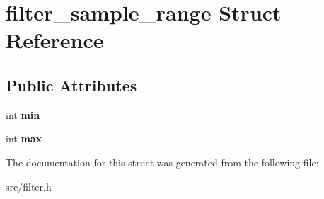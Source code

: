 \hypertarget{structfilter__sample__range}{}\section{filter\+\_\+sample\+\_\+range Struct Reference}
\label{structfilter__sample__range}
\subsection*{Public Attributes}
\begin{DoxyCompactItemize}
\item 
\hypertarget{structfilter__sample__range_a304ee67b1a15b4a0f36ca190a56a38c7}{}int {\bfseries min}\label{structfilter__sample__range_a304ee67b1a15b4a0f36ca190a56a38c7}

\item 
\hypertarget{structfilter__sample__range_a0a29f8303981c999d499070d0a05e05d}{}int {\bfseries max}\label{structfilter__sample__range_a0a29f8303981c999d499070d0a05e05d}

\end{DoxyCompactItemize}


The documentation for this struct was generated from the following file\+:\begin{DoxyCompactItemize}
\item 
src/filter.\+h\end{DoxyCompactItemize}
